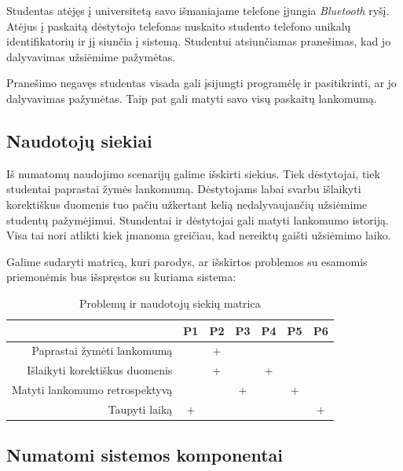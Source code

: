 \documentclass{VUMIFPSkursinis}
\begin{document}
Studentas atėjęs į universitetą savo išmaniajame telefone įjungia \textit{Bluetooth} ryšį. Atėjus į paskaitą dėstytojo telefonas nuskaito studento telefono unikalų identifikatorių ir jį siunčia į sistemą. Studentui atsiunčiamas pranešimas, kad jo dalyvavimas užsiėmime pažymėtas.

Pranešimo negavęs studentas visada gali įsijungti programėlę ir pasitikrinti, ar jo dalyvavimas pažymėtas. Taip pat gali matyti savo visų paskaitų lankomumą.

\subsection{Naudotojų siekiai}

Iš numatomų naudojimo scenarijų galime išskirti siekius. Tiek dėstytojai, tiek studentai paprastai žymės lankomumą. Dėstytojams labai svarbu išlaikyti korektiškus duomenis tuo pačiu užkertant kelią nedalyvaujančių užsiėmime studentų pažymėjimui. Stundentai ir dėstytojai gali matyti lankomumo istoriją. Visa tai nori atlikti kiek įmanoma greičiau, kad nereiktų gaišti užsiėmimo laiko.

Galime sudaryti matricą, kuri parodys, ar išskirtos problemos su esamomis priemonėmis bus išspręstos su kuriama sistema:

\begin{table}[H]
	\centering
	\begin{tabular}{ | r | c | c | c | c | c | c | }
		\hline
		& P1 & P2 & P3 & P4 & P5 & P6 \\
		\hline
		Paprastai žymėti lankomumą &  & + &  &  &  & \\
		\hline
		Išlaikyti korektiškus duomenis &  & + &  & + &  & \\
		\hline
		Matyti lankomumo retrospektyvą &  &  & + &  & + & \\
		\hline
		Taupyti laiką & + &  &  &  &  & + \\
		\hline
	\end{tabular}
	\caption{Problemų ir naudotojų siekių matrica}
	\label{problemTable}
\end{table}

\subsection{Numatomi sistemos komponentai}
\end{document}
